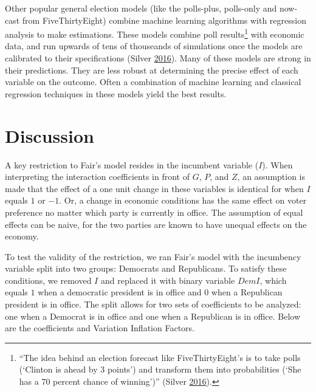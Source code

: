 \documentclass[11,]{article}
\let\rmarkdownfootnote\footnote%
\def\footnote{\protect\rmarkdownfootnote}
\begin{document}
Other popular general election models (like the polls-plus, polls-only
and now-cast from FiveThirtyEight) combine machine learning algorithms
with regression analysis to make estimations. These models combine poll
results\footnote{``The idea behind an election forecast like
  FiveThirtyEight's is to take polls (`Clinton is ahead by 3 points')
  and transform them into probabilities (`She has a 70 percent chance of
  winning')'' (Silver \protect\hyperlink{ref-silver_users_2016}{2016}).}
with economic data, and run upwards of tens of thouseands of simulations
once the models are calibrated to their specifications (Silver
\protect\hyperlink{ref-silver_users_2016}{2016}). Many of these models
are strong in their predictions. They are less robust at determining the
precise effect of each variable on the outcome. Often a combination of
machine learning and classical regression techniques in these models
yield the best results.

\hypertarget{discussion}{%
\section{Discussion}\label{discussion}}

A key restriction to Fair's model resides in the incumbent variable
(\(I\)). When interpreting the interaction coefficients in front of
\(G\), \(P\), and \(Z\), an assumption is made that the effect of a one
unit change in these variables is identical for when \(I\) equals \(1\)
or \(-1\). Or, a change in economic conditions has the same effect on
voter preference no matter which party is currently in office. The
assumption of equal effects can be naive, for the two parties are known
to have unequal effects on the economy.

To test the validity of the restriction, we ran Fair's model with the
incumbency variable split into two groups: Democrats and Republicans. To
satisfy these conditions, we removed \(I\) and replaced it with binary
variable \(DemI\), which equals \(1\) when a democratic president is in
office and \(0\) when a Republican president is in office. The split
allows for two sets of coefficients to be analyzed: one when a Democrat
is in office and one when a Republican is in office. Below are the
coefficients and Variation Inflation Factors.
\end{document}
